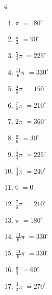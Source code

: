 \begin{multicols}{4}
\begin{enumerate}
  \item $\displaystyle \pi$
        $\displaystyle =180^{\circ}$

  \item $\displaystyle \frac{\pi}{2}$
        $\displaystyle =90^{\circ}$

  \item $\displaystyle \frac{5}{4}\pi$
        $\displaystyle =225^{\circ}$

  \item $\displaystyle \frac{11}{6}\pi$
        $\displaystyle =330^{\circ}$

  \item $\displaystyle \frac{5}{6}\pi$
        $\displaystyle =150^{\circ}$

  \item $\displaystyle \frac{7}{6}\pi$
        $\displaystyle =210^{\circ}$

  \item $\displaystyle 2\pi$
        $\displaystyle =360^{\circ}$

  \item $\displaystyle \frac{\pi}{6}$
        $\displaystyle =30^{\circ}$

  \item $\displaystyle \frac{5}{4}\pi$
        $\displaystyle =225^{\circ}$

  \item $\displaystyle \frac{4}{3}\pi$
        $\displaystyle =240^{\circ}$

  \item $\displaystyle 0$
        $\displaystyle =0^{\circ}$

  \item $\displaystyle \frac{7}{6}\pi$
        $\displaystyle =210^{\circ}$

  \item $\displaystyle \pi$
        $\displaystyle =180^{\circ}$

  \item $\displaystyle \frac{11}{6}\pi$
        $\displaystyle =330^{\circ}$

  \item $\displaystyle \frac{11}{6}\pi$
        $\displaystyle =330^{\circ}$

  \item $\displaystyle \frac{\pi}{3}$
        $\displaystyle =60^{\circ}$

  \item $\displaystyle \frac{3}{2}\pi$
        $\displaystyle =270^{\circ}$


\end{enumerate}
\end{multicols}
